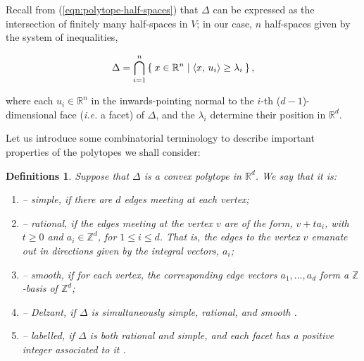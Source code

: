 \documentclass{amsart}
\newtheorem{definitions}[theorem]{Definitions}
\newcommand{\ie}{\emph{i.e.} }
\newcommand{\RR}{\mathbb{R}}
\newcommand{\ZZ}{\mathbb{Z}}
\begin{document}
   Recall from (\ref{eqn:polytope-half-spaces}) that $\Delta$ can be expressed as the intersection of finitely many half-spaces in $V$; in our case, $n$ half-spaces given by the system of inequalities,
   
   \begin{equation}\label{eqn:intersection-polytope-half-spaces}
       \Delta = \bigcap_{i=1}^{n} \Set{x \in \RR^{n} | \langle x,\, u_{i} \rangle \geq \lambda_{i}},
   \end{equation}
    
    where each $u_{i} \in \RR^{n}$ in the inwards-pointing normal to the $i$-th ($d-1$)-dimensional face (\ie a facet) of $\Delta$, and the $\lambda_{i}$ determine their position in $\RR^{d}$.
    
    Let us introduce some combinatorial terminology to describe important properties of the polytopes we shall consider:
    
    \begin{definitions}\label{defn:polytope-properties}
        Suppose that $\Delta$ is a convex polytope in $\RR^{d}$. We say that it is:
            \begin{enumerate}
                \item[\textbf{\upshape 3.1.1.}] -- \emph{simple}, if there are $d$ edges meeting at each vertex;
                
                \item[\textbf{\upshape 3.1.2.}] -- \emph{rational}, if the edges meeting at the vertex $v$ are of the form, $v + ta_{i}$, with $t \geq 0$ and $a_{i} \in \ZZ^{d}$, for $1 \leq i \leq d$. That is, the edges to the vertex $v$ emanate out in directions given by the integral vectors, $a_{i}$;
                
                \item[\textbf{\upshape 3.1.3.}] -- \emph{smooth}, if for each vertex, the corresponding edge vectors $a_{1}, \ldots, a_{d}$ form a $\ZZ$-basis of $\ZZ^{d}$;
                
                 \item[\textbf{\upshape 3.1.4.}] -- \emph{Delzant}, if $\Delta$ is simultaneously simple, rational, and smooth \cite{Del88}.

                \item[\textbf{\upshape 3.1.5.}] -- \emph{labelled}, if $\Delta$ is both rational and simple, and each facet has a positive integer associated to it \cite{Lerman1997}.
            \end{enumerate}
    \end{definitions}
    
\end{document}
